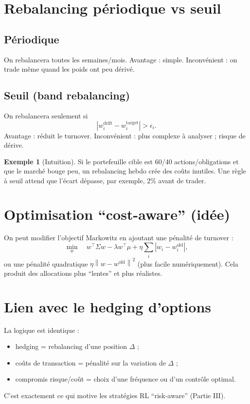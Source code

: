 \documentclass[11pt,a4paper]{report}
\newcommand{\1}{\mathbbm{1}}
\newcommand{\abs}[1]{\left|#1\right|}
\newcommand{\norm}[1]{\left\|#1\right\|}
\theoremstyle{definition}
\newtheorem{example}{Exemple}[chapter]
\theoremstyle{plain}
\theoremstyle{remark}
\begin{document}
\section{Rebalancing périodique vs seuil}
\subsection{Périodique}
On rebalancera toutes les semaines/mois.
Avantage : simple.
Inconvénient : on trade même quand les poids ont peu dérivé.

\subsection{Seuil (band rebalancing)}
On rebalancera seulement si
\[
\abs{w_i^{\text{drift}} - w_i^{\text{target}}} > \epsilon_i.
\]
Avantage : réduit le turnover.
Inconvénient : plus complexe à analyser ; risque de dérive.

\begin{example}[Intuition]
Si le portefeuille cible est 60/40 actions/obligations et que le marché bouge peu,
un rebalancing hebdo crée des coûts inutiles.
Une règle à seuil attend que l'écart dépasse, par exemple, 2\% avant de trader.
\end{example}

\section{Optimisation ``cost-aware'' (idée)}
On peut modifier l'objectif Markowitz en ajoutant une pénalité de turnover :
\[
\min_w \quad w^\top \Sigma w - \lambda w^\top \mu + \eta \sum_i \abs{w_i-w_i^{\text{old}}},
\]
ou une pénalité quadratique $\eta\norm{w-w^{\text{old}}}^2$ (plus facile numériquement).
Cela produit des allocations plus ``lentes'' et plus réalistes.

\section{Lien avec le hedging d'options}
La logique est identique :
\begin{itemize}
  \item hedging = rebalancing d'une position $\Delta$ ;
  \item coûts de transaction = pénalité sur la variation de $\Delta$ ;
  \item compromis risque/coût = choix d'une fréquence ou d'un contrôle optimal.
\end{itemize}
C'est exactement ce qui motive les stratégies RL ``risk-aware'' (Partie III).
\end{document}
